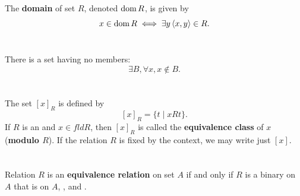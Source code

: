 \documentclass{report}
\newcommand{\pair}[1]{\left< #1 \right>}
\begin{document}
The \textbf{domain} of set $R$, denoted $\mathop{\text{dom}}{R}$, is given by
  $$x \in \dom{R} \iff \exists y \pair{x, y} \in R.$$

\begin{definition}

  \statementpadding



\end{definition}

\section{}%

There is a set having no members:
  $$\exists B, \forall x, x \not\in B.$$

\begin{axiom}


\end{axiom}

\section{}%

The set $[x]_R$ is defined by $$[x]_R = \{t \mid xRt\}.$$
If $R$ is an  and $x \in fld R$, then $[x]_R$
  is called the \textbf{equivalence class} of $x$ (\textbf{modulo $R$}).
If the relation $R$ is fixed by the context, we may write just $[x]$.

\begin{definition}


\end{definition}

\section{}%

Relation $R$ is an \textbf{equivalence relation} on set $A$ if and only if
  $R$ is a binary  on $A$ that is 
  on $A$, , and .
\end{document}
